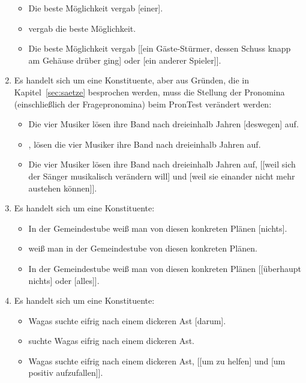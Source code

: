 \begin{enumerate}
    \begin{itemize}
      \item \PronTest Die beste Möglichkeit vergab [einer].
      \item {} vergab die beste Möglichkeit.
      \item \KoorTest Die beste Möglichkeit vergab [[ein Gäste-Stürmer, dessen Schuss knapp am Gehäuse drüber ging] oder [ein anderer Spieler]].
    \end{itemize}
  \item Es handelt sich um eine Konstituente, aber aus Gründen, die in Kapitel~\ref{sec:saetze} besprochen werden, muss die Stellung der Pronomina (einschließlich der Fragepronomina) beim PronTest verändert werden:
    \begin{itemize}
      \item \PronTest Die vier Musiker lösen ihre Band nach dreieinhalb Jahren [deswegen] auf.
      \item {}, lösen die vier Musiker ihre Band nach dreieinhalb Jahren auf.
      \item \KoorTest Die vier Musiker lösen ihre Band nach dreieinhalb Jahren auf, [[weil sich der Sänger musikalisch verändern will] und [weil sie einander nicht mehr austehen können]].
    \end{itemize}
  \item Es handelt sich um eine Konstituente:
    \begin{itemize}
      \item \PronTest In der Gemeindestube weiß man von diesen konkreten Plänen [nichts].
      \item {} weiß man in der Gemeindestube von diesen konkreten Plänen.
      \item \KoorTest In der Gemeindestube weiß man von diesen konkreten Plänen [[überhaupt nichts] oder [alles]].
    \end{itemize}
  \item Es handelt sich um eine Konstituente:
    \begin{itemize}
      \item \PronTest \Ast Wagas suchte eifrig nach einem dickeren Ast [darum].
      \item \VfTest [Um zu helfen] suchte Wagas eifrig nach einem dickeren Ast.
      \item \KoorTest Wagas suchte eifrig nach einem dickeren Ast, [[um zu helfen] und [um positiv aufzufallen]].

\end{itemize}
\end{enumerate}
